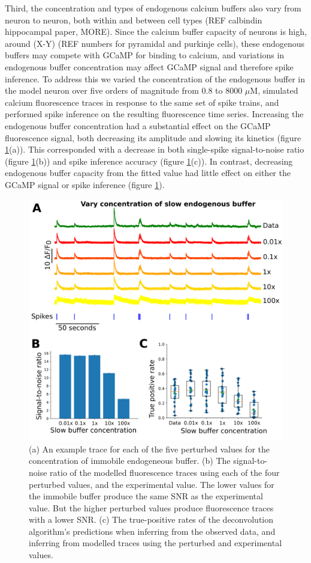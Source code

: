 \documentclass[a4paper,12pt]{article}
\theoremstyle{definition}
\begin{document}
Third, the concentration and types of endogenous calcium buffers also vary from neuron to neuron, both within and between cell types (REF calbindin hippocampal paper, MORE). Since the calcium buffer capacity of neurons is high, around (X-Y) (REF numbers for pyramidal and purkinje cells), these endogenous buffers may compete with GCaMP for binding to calcium, and variations in endogenous buffer concentration may affect GCaMP signal and therefore spike inference. To address this we varied the concentration of the endogenous buffer in the model neuron over five orders of magnitude from $0.8$ to $8000$ $\mu$M, simulated calcium fluorescence traces in response to the same set of spike trains, and performed spike inference on the resulting fluorescence time series. Increasing the endogenous buffer concentration had a substantial effect on the GCaMP fluorescence signal, both decreasing its amplitude and slowing its kinetics (figure \ref{fig:endogeneous_perturbed}(a)). This corresponded with a decrease in both single-spike signal-to-noise ratio (figure \ref{fig:endogeneous_perturbed}(b)) and spike inference accuracy (figure \ref{fig:endogeneous_perturbed}(c)). In contrast, decreasing endogenous buffer capacity from the fitted value had little effect on either the GCaMP signal or spike inference (figure \ref{fig:endogeneous_perturbed}).

\begin{figure}[h]
\centering
\includegraphics[width=0.7\linewidth]{figures/Figure_immobile.png}
\caption{(a) An example trace for each of the five perturbed values for the concentration of immobile endogeneous buffer.	(b) The signal-to-noise ratio of the modelled fluorescence traces using each of the four perturbed values, and the experimental value. The lower values for the immobile buffer produce the same SNR as the experimental value. But the higher perturbed values produce fluorescence traces with a lower SNR.	(c) The true-positive rates of the deconvolution algorithm's predictions when inferring from the observed data, and inferring from modelled traces using the perturbed and experimental values.}
    \label{fig:endogeneous_perturbed}
\end{figure}
\end{document}
